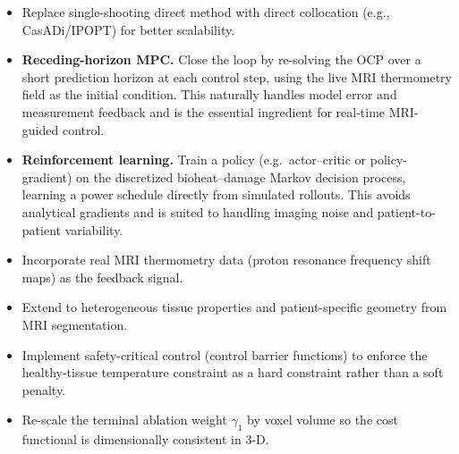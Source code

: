 \begin{itemize}
    \item Replace single-shooting direct method with direct collocation
          (e.g., CasADi/IPOPT) for better scalability.
    \item \textbf{Receding-horizon MPC.} Close the loop by re-solving the
          OCP over a short prediction horizon at each control step, using
          the live MRI thermometry field as the initial condition. This
          naturally handles model error and measurement feedback and is the
          essential ingredient for real-time MRI-guided control.
    \item \textbf{Reinforcement learning.} Train a policy (e.g.\
          actor--critic or policy-gradient) on the discretized
          bioheat--damage Markov decision process, learning a power schedule
          directly from
          simulated rollouts. This avoids analytical gradients and is suited
          to handling imaging noise and patient-to-patient variability.
    \item Incorporate real MRI thermometry data (proton resonance
          frequency shift maps) as the feedback signal.
    \item Extend to heterogeneous tissue properties and patient-specific
          geometry from MRI segmentation.
    \item Implement safety-critical control (control barrier functions)
          to enforce the healthy-tissue temperature constraint as a
          hard constraint rather than a soft penalty.
    \item Re-scale the terminal ablation weight $\gamma_1$ by voxel volume
          so the cost functional is dimensionally consistent in 3-D.
\end{itemize}
